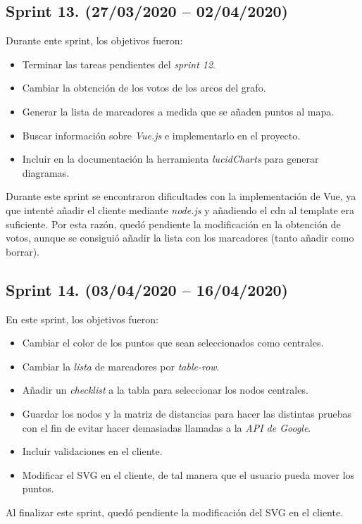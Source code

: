 \subsection{Sprint 13. (27/03/2020 -- 02/04/2020)}
Durante ente sprint, los objetivos fueron:
\begin{itemize}
	\item Terminar las tareas pendientes del \textit{sprint 12}.
	\item Cambiar la obtención de los votos de los arcos del grafo.
	\item Generar la lista de marcadores a medida que se añaden puntos al mapa.
	\item Buscar información sobre \textit{Vue.js} e implementarlo en el proyecto.
	\item Incluir en la documentación la herramienta \textit{lucidCharts} para generar diagramas.
\end{itemize}
Durante este sprint se encontraron dificultades con la implementación de Vue, ya que intenté añadir el cliente mediante \textit{node.js} y añadiendo el cdn al template era suficiente. Por esta razón, quedó pendiente la modificación en la obtención de votos, aunque se consiguió añadir la lista con los marcadores (tanto añadir como borrar).

\subsection{Sprint 14. (03/04/2020 -- 16/04/2020)}
En este sprint, los objetivos fueron:
\begin{itemize}
	\item Cambiar el color de los puntos que sean seleccionados como centrales.
	\item Cambiar la \textit{lista} de marcadores por \textit{table-row}.
	\item Añadir un \textit{checklist} a la tabla para seleccionar los nodos centrales.
	\item Guardar los nodos y la matriz de distancias para hacer las distintas pruebas con el fin de evitar hacer demasiadas llamadas a la \textit{API de Google}.
	\item Incluir validaciones en el cliente.
	\item Modificar el SVG en el cliente, de tal manera que el usuario pueda mover los puntos.
\end{itemize}
Al finalizar este sprint, quedó pendiente la modificación del SVG en el cliente.

